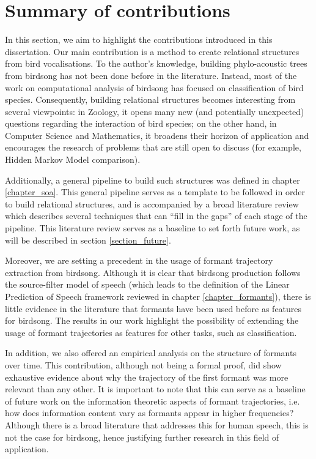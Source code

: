 \documentclass[../main.tex]{subfiles}
\begin{document}
\section{Summary of contributions}
In this section, we aim to highlight the contributions introduced in this dissertation. Our main contribution is a method to create relational structures from bird vocalisations. To the author's knowledge, building phylo-acoustic trees from birdsong has not been done before in the literature. Instead, most of the work on computational analysis of birdsong has focused on classification of bird species. Consequently, building relational structures becomes interesting from several viewpoints: in Zoology, it opens many new (and potentially unexpected) questions regarding the interaction of bird species; on the other hand, in Computer Science and Mathematics, it broadens their horizon of application and encourages the research of problems that are still open to discuss (for example, Hidden Markov Model comparison).
\par Additionally, a general pipeline to build such structures was defined in chapter \ref{chapter_soa}. This general pipeline serves as a template to be followed in order to build relational structures, and is accompanied by a broad literature review which describes several techniques that can ``fill in the gaps'' of each stage of the pipeline. This literature review serves as a baseline to set forth future work, as will be described in section \ref{section_future}.
\par Moreover, we are setting a precedent in the usage of formant trajectory extraction from birdsong. Although it is clear that birdsong production follows the source-filter model of speech (which leads to the definition of the Linear Prediction of Speech framework reviewed in chapter \ref{chapter_formants}), there is little evidence in the literature that formants have been used before as features for birdsong. The results in our work highlight the possibility of extending the usage of formant trajectories as features for other tasks, such as classification. 
\par In addition, we also offered an empirical analysis on the structure of formants over time. This contribution, although not being a formal proof, did show exhaustive evidence about why the trajectory of the first formant was more relevant than any other. It is important to note that this can serve as a baseline of future work on the information theoretic aspects of formant trajectories, i.e. how does information content vary as formants appear in higher frequencies? Although there is a broad literature that addresses this for human speech, this is not the case for birdsong, hence justifying further research in this field of application.
\end{document}
